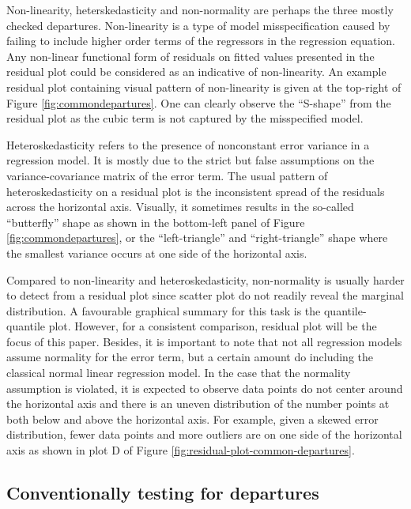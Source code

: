 \documentclass[]{interact}
\theoremstyle{plain}%
\theoremstyle{definition}
\theoremstyle{remark}
\begin{document}
Non-linearity, heterskedasticity and non-normality are perhaps the three
mostly checked departures. Non-linearity is a type of model
misspecification caused by failing to include higher order terms of the
regressors in the regression equation. Any non-linear functional form of
residuals on fitted values presented in the residual plot could be
considered as an indicative of non-linearity. An example residual plot
containing visual pattern of non-linearity is given at the top-right of
Figure \ref{fig:commondepartures}. One can clearly observe the
``S-shape'' from the residual plot as the cubic term is not captured by
the misspecified model.

Heteroskedasticity refers to the presence of nonconstant error variance
in a regression model. It is mostly due to the strict but false
assumptions on the variance-covariance matrix of the error term. The
usual pattern of heteroskedasticity on a residual plot is the
inconsistent spread of the residuals across the horizontal axis.
Visually, it sometimes results in the so-called ``butterfly'' shape as
shown in the bottom-left panel of Figure \ref{fig:commondepartures}, or
the ``left-triangle'' and ``right-triangle'' shape where the smallest
variance occurs at one side of the horizontal axis.

Compared to non-linearity and heteroskedasticity, non-normality is
usually harder to detect from a residual plot since scatter plot do not
readily reveal the marginal distribution. A favourable graphical summary
for this task is the quantile-quantile plot. However, for a consistent
comparison, residual plot will be the focus of this paper. Besides, it
is important to note that not all regression models assume normality for
the error term, but a certain amount do including the classical normal
linear regression model. In the case that the normality assumption is
violated, it is expected to observe data points do not center around the
horizontal axis and there is an uneven distribution of the number points
at both below and above the horizontal axis. For example, given a skewed
error distribution, fewer data points and more outliers are on one side
of the horizontal axis as shown in plot D of Figure
\ref{fig:residual-plot-common-departures}.

\hypertarget{conventionally-testing-for-departures}{%
\subsection{Conventionally testing for
departures}\label{conventionally-testing-for-departures}}
\end{document}
